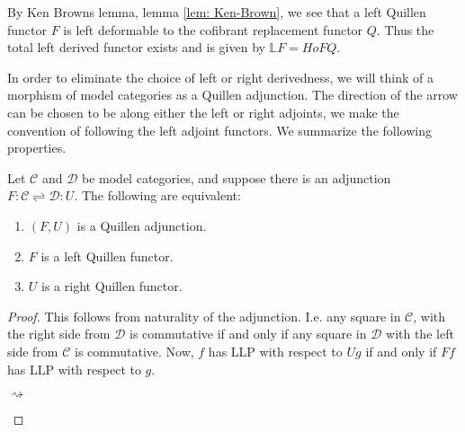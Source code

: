 \documentclass[../thesis.tex]{subfiles}
\begin{document}
            \begin{remark}
                By Ken Browns lemma, lemma \ref{lem: Ken-Brown}, we see that a left Quillen functor $F$ is left deformable to the cofibrant replacement functor $Q$. Thus the total left derived functor exists and is given by $\mathbb{L}F = Ho FQ$.
            \end{remark}

            In order to eliminate the choice of left or right derivedness, we will think of a morphism of model categories as a Quillen adjunction. The direction of the arrow can be chosen to be along either the left or right adjoints, we make the convention of following the left adjoint functors. We summarize the following properties.

            \begin{lemma}\label{lem: Quill-adj}
                Let $\mathcal{C}$ and $\mathcal{D}$ be model categories, and suppose there is an adjunction $F:\mathcal{C}\rightleftharpoons\mathcal{D}:U$. The following are equivalent:
                \begin{enumerate}
                    \item $(F,U)$ is a Quillen adjunction.
                    \item $F$ is a left Quillen functor.
                    \item $U$ is a right Quillen functor.
                \end{enumerate}
            \end{lemma}

            \begin{proof}
                This follows from naturality of the adjunction. I.e. any square in $\mathcal{C}$, with the right side from $\mathcal{D}$ is commutative if and only if any square in $\mathcal{D}$ with the left side from $\mathcal{C}$ is commutative. Now, $f$ has LLP with respect to $Ug$ if and only if $Ff$ has LLP with respect to $g$.
                \begin{center}
                     $\rightsquigarrow$
                \end{center} 
            \end{proof}
\end{document}

